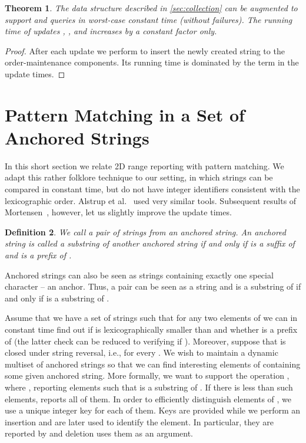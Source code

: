 \documentclass[a4paper]{article}
\newtheorem{theorem}{Theorem}[section]
\newtheorem{definition}[theorem]{Definition}
\theoremstyle{remark}
\begin{document}
\begin{theorem}\label{thm:persistent_compare}
The data structure described in \cref{sec:collection} can be augmented to support  and 
queries in worst-case constant time (without failures). The running time of updates , , and  increases by a constant factor only.
\end{theorem}

\begin{proof}
After each update we perform  to insert the newly created string to the order-maintenance components.
Its running time  is dominated by the  term in the update times.
\end{proof}


\section{Pattern Matching in a Set of Anchored Strings}\label{sec:anchored}
In this short section we relate 2D range reporting with pattern matching.
We adapt this rather folklore technique to our setting,
in which strings can be compared in constant time,
but do not have integer identifiers consistent with the lexicographic order.
Alstrup et al.~\cite{Alstrup} used very similar tools.
Subsequent results of Mortensen~\cite{Mortensen:2003}, however, let us slightly improve the update times.

\begin{definition}
  We call a pair  of strings from  an \emph{anchored}
  string.
  An anchored string 
  is called a \emph{substring}
  of another anchored string  if and only if
   is a suffix of  and  is a prefix of .
\end{definition}

Anchored strings can also be seen as strings containing exactly
one special character  -- an anchor.
Thus, a pair  can be seen as a string  and
 is a substring of  if and only if
 is a substring of .

Assume that we have a set  of strings such that for any two elements 
of  we can in constant time find out if  is lexicographically smaller than 
and whether  is a prefix of  (the latter check can be reduced to verifying if ).
Moreover, suppose that  is closed under string reversal, i.e.,  for every .
We wish to maintain a dynamic multiset of anchored strings 
so that we can find
interesting elements of  containing some given anchored string.
More formally, we want to support the operation ,
where , reporting  elements  such that 
is a substring of .
If there is less than  such elements,  reports
all of them.
In order to efficiently distinguish elements of , we use a unique integer key
for each of them. Keys are provided while we perform an insertion and are later used
to identify the element. In particular, they are reported by 
and deletion uses them as an argument.
\end{document}
